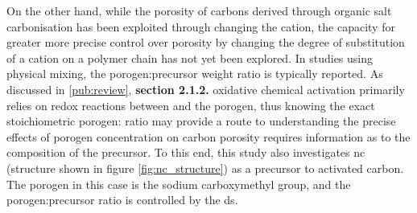 On the other hand, while the porosity of carbons derived through organic salt carbonisation has been exploited through changing the cation,\citep{Sevilla2013general, Tsumura2014Structure, Ferrero2015Mesoporous, Ferrero2016Efficient, Fuertes2015Hierarchical, Roberts2015Hierarchically, Yadav20123D, Yang2018Spontaneous} the capacity for greater more precise control over porosity by changing the degree of substitution of a cation on a polymer chain has not yet been explored. In studies using physical mixing, the \gls{porogen}:precursor weight ratio is typically reported.\citep{Altwala2020Predictable, Adeniran2015Compactivation, Blankenship2017Cigarette, Sevilla2016green, Ludwinowicz2015Potassium, Deng2015Inspired, Alhamed2015Preparation, Hu2003simple} As discussed in \ref{pub:review}, \textbf{section 2.1.2.} oxidative chemical activation primarily relies on redox reactions between  and the \gls{porogen}, thus knowing the exact stoichiometric  \gls{porogen}: ratio may provide a route to understanding the precise effects of \gls{porogen} concentration on carbon porosity requires information as to the composition of the precursor. To this end, this study also investigates \acrfull{nc} (structure shown in figure \ref{fig:nc_structure}) as a precursor to activated carbon. The \gls{porogen} in this case is the sodium carboxymethyl group, and the \gls{porogen}:precursor ratio is controlled by the \acrfull{ds}.


